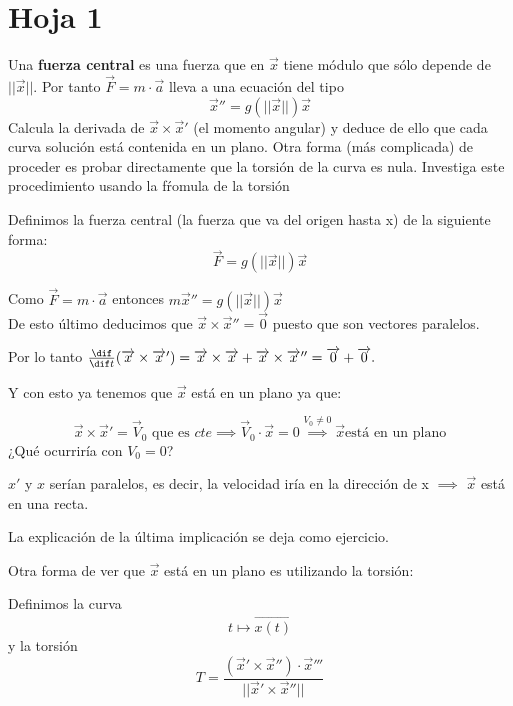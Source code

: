\section{Hoja 1}
\begin{problem}[1]
Una \textbf{fuerza central} es una fuerza que en $\overrightarrow{x}$ tiene módulo que sólo depende de $||\overrightarrow{x}||$. Por tanto $\overrightarrow F=m\cdot \overrightarrow a$ lleva a una ecuación del tipo
\[\overrightarrow x '' =g(||\overrightarrow x||)\overrightarrow x\]
Calcula la derivada de $\overrightarrow x\times \overrightarrow  x'$ (el momento angular) y deduce de ello que cada curva solución está contenida en un plano. Otra forma (más complicada) de proceder es probar directamente que la torsión de la curva es nula. Investiga este procedimiento usando la fŕomula de la torsión

\solution
	Definimos la fuerza central (la fuerza que va del origen hasta x) de la siguiente forma:$$\overrightarrow F = g(||\overrightarrow x||) \overrightarrow x$$

	Como $\overrightarrow F = m \cdot \overrightarrow a$ entonces $m\overrightarrow x'' = g(||\overrightarrow x||) \overrightarrow x$\\
	De esto último deducimos que $\overrightarrow x \times \overrightarrow x'' = \overrightarrow 0$ puesto que son vectores paralelos.

	Por lo tanto $\frac{\dif}{\dif t}(\overrightarrow x \times \overrightarrow x') = \overrightarrow x \times \overrightarrow x + \overrightarrow x \times \overrightarrow x '' = \overrightarrow 0 + \overrightarrow 0.$

	Y con esto ya tenemos que $\overrightarrow x $ está en un plano ya que:

	$$\overrightarrow x \times \overrightarrow x' = \overrightarrow V_0 \text{ que es }
	cte \implies \overrightarrow V_0 \cdot \overrightarrow x = 0 \stackrel{V_0 \neq 0}{\implies} \overrightarrow x \text{está en un plano}$$
	¿Qué ocurriría con $V_0 = 0$?

	$x'$ y $x$ serían paralelos, es decir, la velocidad iría en la dirección de x $\implies$ $\overrightarrow x$ está en una recta.

	La explicación de la última implicación se deja como ejercicio.

	Otra forma de ver que $\overrightarrow x$ está en un plano es utilizando la torsión:

	Definimos la curva
	\[t \mapsto \overrightarrow{x(t)}\]
	y la torsión
	\[T = \frac{(\overrightarrow x' \times \overrightarrow x'') \cdot \overrightarrow x'''}{||\overrightarrow x' \times \overrightarrow x ''||}\]


\end{problem}
